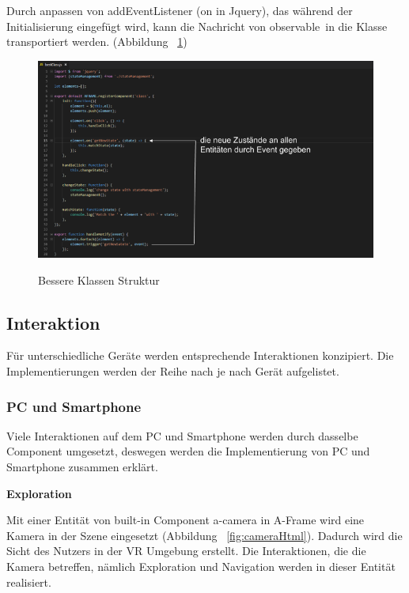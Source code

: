  Durch anpassen von {\selectfont addEventListener} ({\selectfont on} in Jquery), das während der Initialisierung eingefügt wird, kann die Nachricht von \glqq observable\grqq\ in die Klasse transportiert werden. (Abbildung ~\ref{fig:bestesClass})
 
\begin{figure}[ht]
\vspace*{1em}
\centering
\caption[Bessere Klassen Struktur]{Bessere Klassen Struktur}
\includegraphics[width=\textwidth]{images/bestClass.png}
\label{fig:bestesClass} 
\end{figure}
 
 \subsection{Interaktion}
  Für unterschiedliche Geräte werden entsprechende Interaktionen konzipiert. Die Implementierungen werden der Reihe nach je nach Gerät aufgelistet.
  
  \subsubsection{PC und Smartphone}
  Viele Interaktionen auf dem PC und Smartphone werden durch dasselbe Component umgesetzt, deswegen werden die Implementierung von PC und Smartphone zusammen erklärt.
  
  \textbf{Exploration}
  
  Mit einer Entität von built-in Component {\selectfont a-camera} in A-Frame wird eine Kamera in der Szene eingesetzt (Abbildung ~\ref{fig:cameraHtml}). Dadurch wird die Sicht des Nutzers in der VR Umgebung erstellt. Die Interaktionen, die die Kamera betreffen, nämlich Exploration und Navigation werden in dieser Entität realisiert.
  
